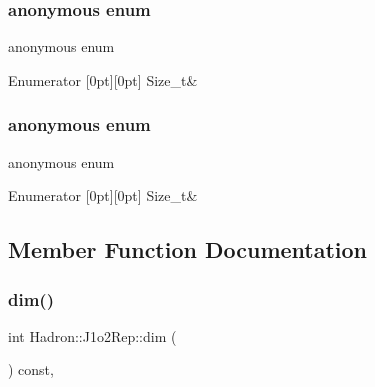 \subsubsection{\texorpdfstring{anonymous enum}{anonymous enum}}
{\footnotesize\ttfamily anonymous enum}

\begin{DoxyEnumFields}{Enumerator}
[0pt][0pt]{}\mbox{\label{structHadron_1_1J1o2Rep_a69f7a020556d38ed8efabb8254947e41ab3e025d42324973311b24f69bf7b64bf}} 
Size\+\_\+t&\\
\hline

\end{DoxyEnumFields}
\mbox{\label{structHadron_1_1J1o2Rep_a69f7a020556d38ed8efabb8254947e41}} 
\subsubsection{\texorpdfstring{anonymous enum}{anonymous enum}}
{\footnotesize\ttfamily anonymous enum}

\begin{DoxyEnumFields}{Enumerator}
[0pt][0pt]{}\mbox{\label{structHadron_1_1J1o2Rep_a69f7a020556d38ed8efabb8254947e41ab3e025d42324973311b24f69bf7b64bf}} 
Size\+\_\+t&\\
\hline

\end{DoxyEnumFields}


\subsection{Member Function Documentation}
\mbox{\label{structHadron_1_1J1o2Rep_a2867fb4e13ae7883345606038d6b833b}} 
\subsubsection{\texorpdfstring{dim()}{dim()}\hspace{0.1cm}{\footnotesize\ttfamily [1/3]}}
{\footnotesize\ttfamily int Hadron\+::\+J1o2\+Rep\+::dim (\begin{DoxyParamCaption}{ }\end{DoxyParamCaption}) const\hspace{0.3cm}{\ttfamily [inline]}, {\ttfamily [virtual]}}



